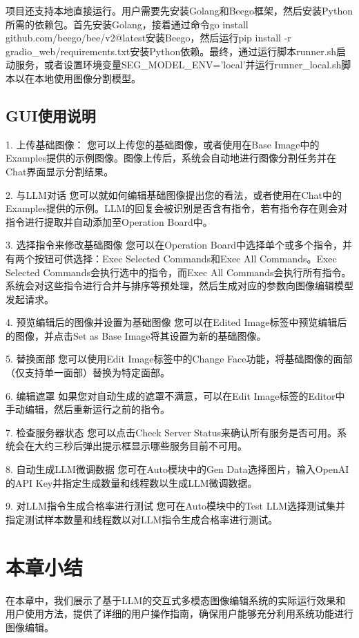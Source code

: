 \documentclass[a4paper,AutoFakeBold,oneside,12pt]{book}
\begin{document}
项目还支持本地直接运行。用户需要先安装Golang和Beego框架，然后安装Python所需的依赖包。首先安装Golang，接着通过命令go install github.com/beego/bee/v2@latest安装Beego，然后运行pip install -r gradio\_web/requirements.txt安装Python依赖。最终，通过运行脚本runner.sh启动服务，或者设置环境变量SEG\_MODEL\_ENV='local'并运行runner\_local.sh脚本以在本地使用图像分割模型。

\subsection{GUI使用说明}
1. 上传基础图像：
您可以上传您的基础图像，或者使用在Base Image中的Examples提供的示例图像。图像上传后，系统会自动地进行图像分割任务并在Chat界面显示分割结果。

2. 与LLM对话
您可以就如何编辑基础图像提出您的看法，或者使用在Chat中的Examples提供的示例。LLM的回复会被识别是否含有指令，若有指令存在则会对指令进行提取并自动添加至Operation Board中。

3. 选择指令来修改基础图像
您可以在Operation Board中选择单个或多个指令，并有两个按钮可供选择：Exec Selected Commands和Exec All Commands。Exec Selected Commands会执行选中的指令，而Exec All Commands会执行所有指令。系统会对这些指令进行合并与排序等预处理，然后生成对应的参数向图像编辑模型发起请求。

4. 预览编辑后的图像并设置为基础图像
您可以在Edited Image标签中预览编辑后的图像，并点击Set as Base Image将其设置为新的基础图像。

5. 替换面部
您可以使用Edit Image标签中的Change Face功能，将基础图像的面部（仅支持单一面部）替换为特定面部。

6. 编辑遮罩
如果您对自动生成的遮罩不满意，可以在Edit Image标签的Editor中手动编辑，然后重新运行之前的指令。

7. 检查服务器状态
您可以点击Check Server Status来确认所有服务是否可用。系统会在大约三秒后弹出提示框显示哪些服务目前不可用。

8. 自动生成LLM微调数据
您可在Auto模块中的Gen Data选择图片，输入OpenAI的API Key并指定生成数量和线程数以生成LLM微调数据。

9. 对LLM指令生成合格率进行测试
您可在Auto模块中的Test LLM选择测试集并指定测试样本数量和线程数以对LLM指令生成合格率进行测试。

\section{本章小结}
在本章中，我们展示了基于LLM的交互式多模态图像编辑系统的实际运行效果和用户使用方法，提供了详细的用户操作指南，确保用户能够充分利用系统功能进行图像编辑。
\end{document}
